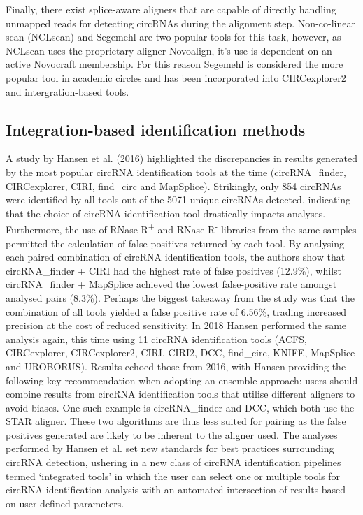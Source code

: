 \documentclass[pdflatex,sn-mathphys-num]{sn-jnl}
\begin{document}
Finally, there exist splice-aware aligners that are capable of directly handling unmapped reads for detecting circRNAs during the alignment step. Non-co-linear scan (NCLscan) \cite{NCLscan} and Segemehl \cite{segemehl} are two popular tools for this task, however, as NCLscan uses the proprietary aligner Novoalign, it's use is dependent on an active Novocraft membership. For this reason Segemehl is considered the more popular tool in academic circles and has been incorporated into CIRCexplorer2 and intergration-based tools.

\subsection{Integration-based identification methods} \label{Integration-based identification methods}
A study by Hansen et al. (2016) \cite{Hansen2016Apr} highlighted the discrepancies in results generated by the most popular circRNA identification tools at the time (circRNA\_finder, CIRCexplorer, CIRI, find\_circ and MapSplice). Strikingly, only 854 circRNAs were identified by all tools out of the 5071 unique circRNAs detected, indicating that the choice of circRNA identification tool drastically impacts analyses. Furthermore, the use of RNase R\textsuperscript{+} and RNase R\textsuperscript{-} libraries from the same samples permitted the calculation of false positives returned by each tool. By analysing each paired combination of circRNA identification tools, the authors show that circRNA\_finder + CIRI had the highest rate of false positives (12.9\%), whilst circRNA\_finder + MapSplice achieved the lowest false-positive rate amongst analysed pairs (8.3\%). Perhaps the biggest takeaway from the study was that the combination of all tools yielded a false positive rate of 6.56\%, trading increased precision at the cost of reduced sensitivity. In 2018 Hansen \cite{Hansen2018} performed the same analysis again, this time using 11 circRNA identification tools (ACFS, CIRCexplorer, CIRCexplorer2, CIRI, CIRI2, DCC, find\_circ, KNIFE, MapSplice and UROBORUS). Results echoed those from 2016, with Hansen providing the following key recommendation when adopting an ensemble approach: users should combine results from circRNA identification tools that utilise different aligners to avoid biases. One such example is circRNA\_finder and DCC, which both use the STAR aligner. These two algorithms are thus less suited for pairing as the false positives generated are likely to be inherent to the aligner used. The analyses performed by Hansen et al. set new standards for best practices surrounding circRNA detection, ushering in a new class of circRNA identification pipelines termed `integrated tools' in which the user can select one or multiple tools for circRNA identification analysis with an automated intersection of results based on user-defined parameters. \par
\end{document}
